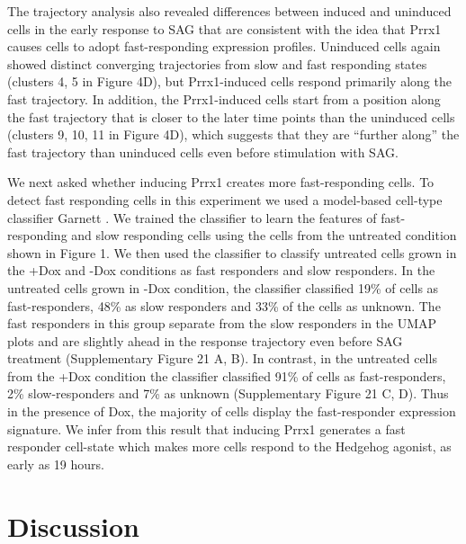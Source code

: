 The trajectory analysis also revealed differences between induced and uninduced cells in the early response to SAG that are consistent with the idea that Prrx1 causes cells to adopt fast-responding expression profiles. Uninduced cells again showed distinct converging trajectories from slow and fast responding states (clusters 4, 5 in Figure 4D), but Prrx1-induced cells respond primarily along the fast trajectory. In addition, the Prrx1-induced cells start from a position along the fast trajectory that is closer to the later time points than the uninduced cells (clusters 9, 10, 11 in Figure 4D), which suggests that they are “further along” the fast trajectory than uninduced cells even before stimulation with SAG. 

We next asked whether inducing Prrx1 creates more fast-responding cells. To detect fast responding cells in this experiment we used a model-based cell-type classifier Garnett \cite{Pliner2019-vn}. We trained the classifier to learn the features of fast-responding and slow responding cells using the cells from the untreated condition shown in Figure 1. We then used the classifier to classify untreated cells grown in the +Dox and -Dox conditions as fast responders and slow responders. In the untreated cells grown in -Dox condition, the classifier classified 19\% of cells as fast-responders, 48\% as slow responders and 33\% of the cells as unknown. The fast responders in this group separate from the slow responders in the UMAP plots and are slightly ahead in the response trajectory even before SAG treatment  (Supplementary Figure 21 A, B). In contrast, in the untreated cells from the +Dox condition the classifier classified 91\% of cells as fast-responders, 2\% slow-responders and 7\% as unknown (Supplementary Figure 21 C, D). Thus in the presence of Dox, the majority of cells display the fast-responder expression signature. We infer from this result that inducing Prrx1 generates a fast responder cell-state which makes more cells respond to the Hedgehog agonist, as early as 19 hours.

\section{Discussion}

